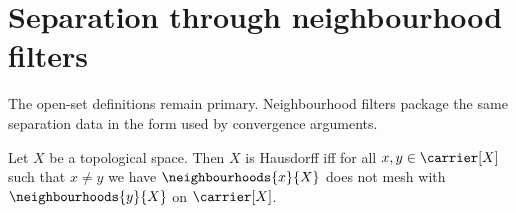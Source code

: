 \section{Separation through neighbourhood filters}





The open-set definitions remain primary.  Neighbourhood filters package the
same separation data in the form used by convergence arguments.

\begin{theorem}\label{hausdorff_iff_neighbourhood_filters_do_not_mesh}
    Let $X$ be a topological space.
    Then $X$ is Hausdorff iff for all $x,y\in\carrier[X]$ such that
        $x\neq y$ we have $\neighbourhoods{x}{X}$ does not mesh with
        $\neighbourhoods{y}{X}$ on $\carrier[X]$.
\end{theorem}
